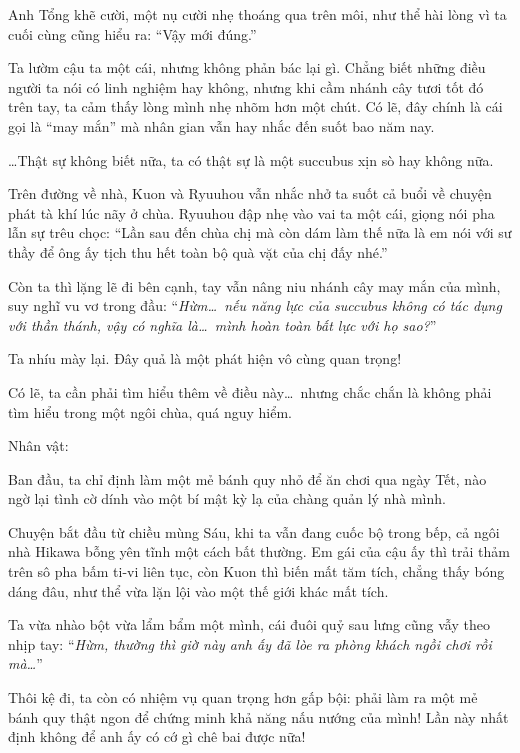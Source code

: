 \documentclass[../main.tex]{subfiles}
\begin{document}
Anh Tổng khẽ cười, một nụ cười nhẹ thoáng qua trên môi, như thể hài lòng vì ta cuối cùng cũng hiểu ra: ``Vậy mới đúng.''

Ta lườm cậu ta một cái, nhưng không phản bác lại gì. Chẳng biết những điều người ta nói có linh nghiệm hay không, nhưng khi cầm nhánh cây tươi tốt đó trên tay, ta cảm thấy lòng mình nhẹ nhõm hơn một chút. Có lẽ, đây chính là cái gọi là ``may mắn'' mà nhân gian vẫn hay nhắc đến suốt bao năm nay.

\dots Thật sự không biết nữa, ta có thật sự là một succubus xịn sò hay không nữa.

\ct

Trên đường về nhà, Kuon và Ryuuhou vẫn nhắc nhở ta suốt cả buổi về chuyện phát tà khí lúc nãy ở chùa. Ryuuhou đập nhẹ vào vai ta một cái, giọng nói pha lẫn sự trêu chọc: ``Lần sau đến chùa chị mà còn dám làm thế nữa là em nói với sư thầy để ông ấy tịch thu hết toàn bộ quà vặt của chị đấy nhé.''

Còn ta thì lặng lẽ đi bên cạnh, tay vẫn nâng niu nhánh cây may mắn của mình, suy nghĩ vu vơ trong đầu: ``\textit{Hừm\dots\ nếu năng lực của succubus không có tác dụng với thần thánh, vậy có nghĩa là\dots\ mình hoàn toàn bất lực với họ sao?}''

Ta nhíu mày lại. Đây quả là một phát hiện vô cùng quan trọng!

Có lẽ, ta cần phải tìm hiểu thêm về điều này\dots\ nhưng chắc chắn là không phải tìm hiểu trong một ngôi chùa, quá nguy hiểm.

\begin{center}
{\caviar\fontsize{12pt}{12pt}\selectfont Nhân vật:   }
\end{center}

Ban đầu, ta chỉ định làm một mẻ bánh quy nhỏ để ăn chơi qua ngày Tết, nào ngờ lại tình cờ dính vào một bí mật kỳ lạ của chàng quản lý nhà mình.

Chuyện bắt đầu từ chiều mùng Sáu, khi ta vẫn đang cuốc bộ trong bếp, cả ngôi nhà Hikawa bỗng yên tĩnh một cách bất thường. Em gái của cậu ấy thì trải thảm trên sô pha bấm ti-vi liên tục, còn Kuon thì biến mất tăm tích, chẳng thấy bóng dáng đâu, như thể vừa lặn lội vào một thế giới khác mất tích.

Ta vừa nhào bột vừa lẩm bẩm một mình, cái đuôi quỷ sau lưng cũng vẫy theo nhịp tay: ``\textit{Hừm, thường thì giờ này anh ấy đã lòe ra phòng khách ngồi chơi rồi mà\dots}''

Thôi kệ đi, ta còn có nhiệm vụ quan trọng hơn gấp bội: phải làm ra một mẻ bánh quy thật ngon để chứng minh khả năng nấu nướng của mình! Lần này nhất định không để anh ấy có cớ gì chê bai được nữa!
\end{document}
